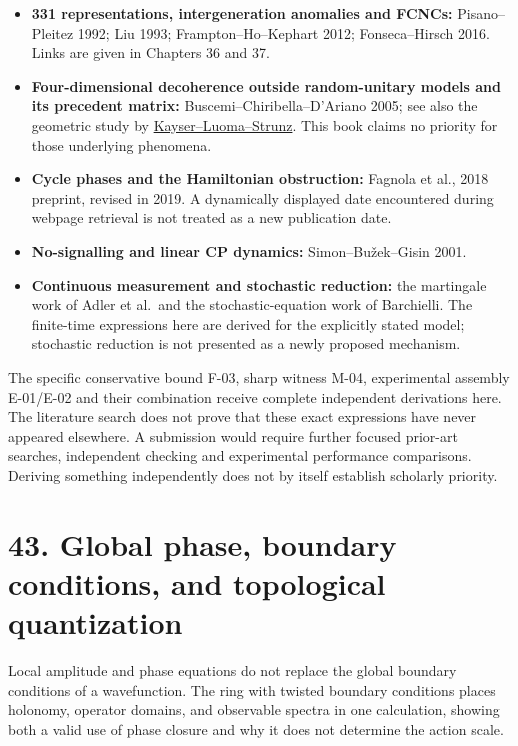\documentclass[
  11pt,
  oneside]{book}
\providecommand{\tightlist}{%
  \setlength{\itemsep}{0pt}\setlength{\parskip}{0pt}}
\begin{document}
\begin{itemize}
\tightlist
\item
  \textbf{331 representations, intergeneration anomalies and FCNCs:}
  Pisano--Pleitez 1992; Liu 1993; Frampton--Ho--Kephart 2012;
  Fonseca--Hirsch 2016. Links are given in Chapters 36 and 37.
\item
  \textbf{Four-dimensional decoherence outside random-unitary models and
  its precedent matrix:} Buscemi--Chiribella--D'Ariano 2005; see also
  the geometric study by
  \href{https://arxiv.org/abs/1508.04027}{Kayser--Luoma--Strunz}. This
  book claims no priority for those underlying phenomena.
\item
  \textbf{Cycle phases and the Hamiltonian obstruction:} Fagnola et al.,
  2018 preprint, revised in 2019. A dynamically displayed date
  encountered during webpage retrieval is not treated as a new
  publication date.
\item
  \textbf{No-signalling and linear CP dynamics:} Simon--Bužek--Gisin
  2001.
\item
  \textbf{Continuous measurement and stochastic reduction:} the
  martingale work of Adler et al.~and the stochastic-equation work of
  Barchielli. The finite-time expressions here are derived for the
  explicitly stated model; stochastic reduction is not presented as a
  newly proposed mechanism.
\end{itemize}

The specific conservative bound F-03, sharp witness M-04, experimental
assembly E-01/E-02 and their combination receive complete independent
derivations here. The literature search does not prove that these exact
expressions have never appeared elsewhere. A submission would require
further focused prior-art searches, independent checking and
experimental performance comparisons. Deriving something independently
does not by itself establish scholarly priority.

\chapter{43. Global phase, boundary conditions, and topological
quantization}\label{ch-43}

Local amplitude and phase equations do not replace the global boundary
conditions of a wavefunction. The ring with twisted boundary conditions
places holonomy, operator domains, and observable spectra in one
calculation, showing both a valid use of phase closure and why it does
not determine the action scale.
\end{document}
